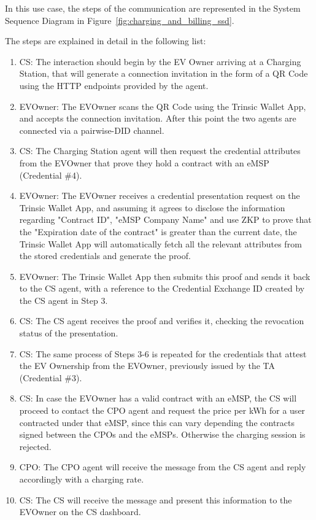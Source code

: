 In this use case, the steps of the communication are represented in the System Sequence Diagram in Figure~\ref{fig:charging_and_billing_ssd}.

The steps are explained in detail in the following list:

\begin{enumerate}
    \item CS: The interaction should begin by the EV Owner arriving at a Charging Station, that will generate a connection invitation in the form of a QR Code using the HTTP endpoints provided by the agent. 
    \item EVOwner: The EVOwner scans the QR Code using the Trinsic Wallet App, and accepts the connection invitation. After this point the two agents are connected via a pairwise-DID channel.
    \item CS: The Charging Station agent will then request the credential attributes from the EVOwner that prove they hold a contract with an eMSP (Credential \#4).
    \item EVOwner: The EVOwner receives a credential presentation request on the Trinsic Wallet App, and assuming it agrees to disclose the information regarding "Contract ID", "eMSP Company Name" and use ZKP to prove that the "Expiration date of the contract" is greater than the current date, the Trinsic Wallet App will automatically fetch all the relevant attributes from the stored credentials and generate the proof.
    \item EVOwner: The Trinsic Wallet App then submits this proof and sends it back to the CS agent, with a reference to the Credential Exchange ID created by the CS agent in Step 3.
    \item CS: The CS agent receives the proof and verifies it, checking the revocation status of the presentation.
    \item CS: The same process of Steps 3-6 is repeated for the credentials that attest the EV Ownership from the EVOwner, previously issued by the TA (Credential \#3).
    \item CS: In case the EVOwner has a valid contract with an eMSP, the CS will proceed to contact the CPO agent and request the price per kWh for a user contracted under that eMSP, since this can vary depending the contracts signed between the CPOs and the eMSPs. Otherwise the charging session is rejected.
    \item CPO: The CPO agent will receive the message from the CS agent and reply accordingly with a charging rate.
    \item CS: The CS will receive the message and present this information to the EVOwner on the CS dashboard.

\end{enumerate}

